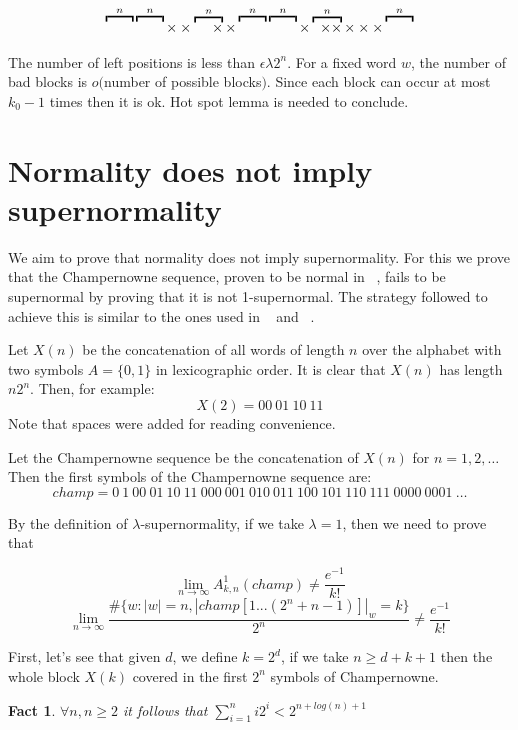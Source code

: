 \documentclass[11pt,a4paper]{tesis}
\newtheorem{fact}{Fact}[section]
\theoremstyle{definition}
\begin{document}
$$\overbracket{\raisebox{6.4pt}{\qquad}}^{n} \overbracket{\raisebox{6.4pt}{\qquad}}^{n}\times\times\overbracket{\;\quad \times}^{n} \times \overbracket{\raisebox{6.4pt}{\qquad}}^{n} \overbracket{\raisebox{6.4pt}{\qquad}}^{n} \times \overbracket{\;\; \times \times}^{n} \times\times\times \overbracket{\raisebox{6.4pt}{\qquad}}^{n}$$


The number of left positions is less than $\epsilon\lambda2^n$. For a fixed word $w$, the number of bad blocks is $o($number of possible blocks$)$. Since each block can occur at most  $k_0 - 1$ times then it is ok.
Hot spot lemma  is needed to conclude.


\section{Normality does not imply supernormality}
We aim to prove that normality does not imply supernormality. For this we prove that the Champernowne sequence, proven to be normal in ~\cite{BC2018}, fails to be supernormal by proving that it is not 1-supernormal.
The strategy followed to achieve this is similar to the ones used in ~\cite{BCC2019} and  ~\cite{PS2019}.


Let $X(n)$ be the concatenation of all words of length $n$ over the alphabet with two symbols $A=\{0,1\}$ in lexicographic order.  It is clear that $X(n)$ has length $n2^n$. Then, for example:
$$X(2) = 00 \: 01 \: 10 \: 11$$
Note that spaces were added for reading convenience.

Let the Champernowne sequence be the concatenation of $X(n)$ for $n = 1,2,\dots$ Then the first symbols of the Champernowne sequence are:
$$champ = 0 \: 1 \: 00 \: 01 \: 10 \: 11 \: 000 \: 001 \: 010 \: 011 \: 100 \: 101 \: 110 \: 111 \: 0000 \: 0001 \: \dots$$

By the definition of $\lambda$-supernormality, if we take $\lambda = 1$, then we need to prove that

$$\lim_{n\to\infty} A^1_{k,n}(champ) \neq \frac{e^{-1}}{k!}$$
$$\lim_{n\to\infty} \frac{\#\{w: |w| = n  , |champ[1...(2^n+n-1)]|_w = k\}}{2^n} \neq \frac{e^{-1}}{k!}$$

\bigskip

First, let's see that given $d$, we define $k = 2^d$, if we take $n \geq d + k + 1$ then the whole block $X(k)$ covered in the first $2^n$ symbols of Champernowne.


\begin{fact}
    $\forall n, n  \geq 2$ it follows that $\sum_{i=1}^n i2^i < 2^{n + log(n) + 1}$ 
\end{fact}
\end{document}
